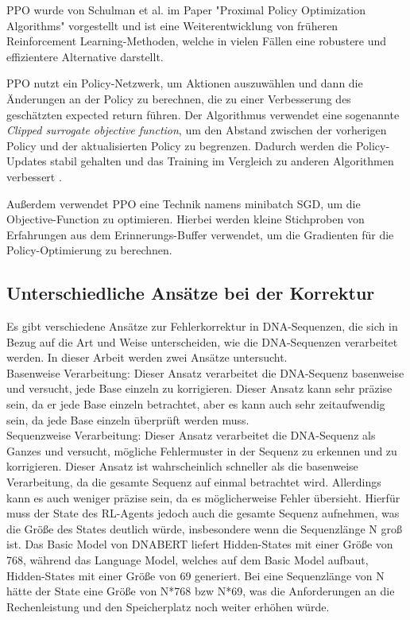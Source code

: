 \documentclass[oneside,bibliography=totocnumbered,BCOR=5mm]{scrbook}%
\theoremstyle{definition}
\theoremstyle{definition}
\theoremstyle{definition}
\theoremstyle{definition}
\theoremstyle{definition}
\theoremstyle{definition}
\begin{document}
PPO wurde von Schulman et al. im Paper "Proximal Policy Optimization Algorithms" 
  vorgestellt und ist eine Weiterentwicklung von früheren Reinforcement Learning-Methoden, welche in
  vielen Fällen eine robustere und effizientere Alternative darstellt.

  PPO nutzt ein Policy-Netzwerk, um Aktionen auszuwählen und dann die Änderungen 
  an der Policy zu berechnen, die zu einer Verbesserung des geschätzten expected return führen. 
  Der Algorithmus verwendet eine sogenannte \textit{Clipped surrogate objective function}, 
  um den Abstand zwischen der vorherigen Policy und der aktualisierten Policy zu begrenzen. \autocite[Seite 3]{PPO}
  Dadurch werden die Policy-Updates stabil gehalten und das Training im Vergleich zu anderen Algorithmen verbessert \autocite[Seite 7]{PPO}.
  
  Außerdem verwendet PPO eine Technik namens minibatch SGD, um die Objective-Function zu optimieren. 
  Hierbei werden kleine Stichproben von Erfahrungen aus dem Erinnerungs-Buffer verwendet, 
  um die Gradienten für die Policy-Optimierung zu berechnen.
  

\subsection{Unterschiedliche Ansätze bei der Korrektur}


Es gibt verschiedene Ansätze zur Fehlerkorrektur in DNA-Sequenzen, 
die sich in Bezug auf die Art und Weise unterscheiden, wie die DNA-Sequenzen verarbeitet werden. 
In dieser Arbeit werden zwei Ansätze untersucht. \\


Basenweise Verarbeitung: Dieser Ansatz verarbeitet die DNA-Sequenz basenweise und versucht, 
jede Base einzeln zu korrigieren. 
Dieser Ansatz kann sehr präzise sein, da er jede Base einzeln betrachtet, 
aber es kann auch sehr zeitaufwendig sein, da jede Base einzeln überprüft werden muss. \\


Sequenzweise Verarbeitung: Dieser Ansatz verarbeitet die DNA-Sequenz als Ganzes und versucht, 
mögliche Fehlermuster in der Sequenz zu erkennen und zu korrigieren. 
Dieser Ansatz ist wahrscheinlich schneller als die basenweise Verarbeitung, 
da die gesamte Sequenz auf einmal betrachtet wird. 
Allerdings kann es auch weniger präzise sein, da es möglicherweise Fehler übersieht.
Hierfür muss der State des RL-Agents jedoch auch die gesamte Sequenz aufnehmen, 
was die Größe des States deutlich würde, insbesondere wenn die Sequenzlänge N groß ist. 
Das Basic Model von DNABERT liefert Hidden-States mit einer Größe von 768, 
während das Language Model, welches auf dem Basic Model aufbaut, Hidden-States mit einer Größe von 69 generiert. 
Bei eine Sequenzlänge von N hätte der State eine Größe von N*768 bzw N*69, 
was die Anforderungen an die Rechenleistung und den Speicherplatz noch weiter erhöhen würde. \\
\end{document}
